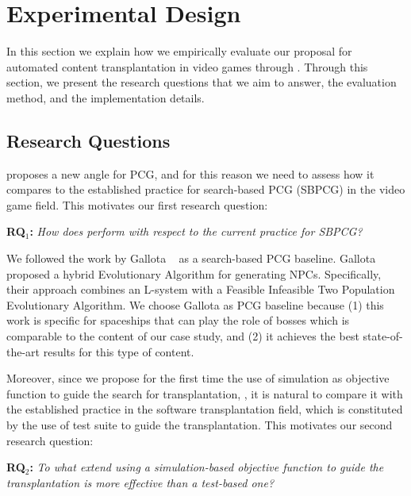 \section{Experimental Design} 
\label{sec:Evaluation}

In this section we explain how we empirically evaluate our proposal for automated content transplantation in video games through \ApproachName{}. 
Through this section, we present the research questions that we aim to answer, the evaluation method, and the implementation details.

\subsection{Research Questions}

\ApproachName{} proposes a new angle for PCG, and for this reason we need to assess how it compares to the established practice for search-based PCG (SBPCG)  in the video game field. This motivates our first research question:

\textbf{RQ$_1$: }\textit{How does \simhotep{} perform with respect to the current practice for SBPCG?}

We followed the work by Gallota \etal~\cite{gallotta2022evolving} as a search-based  PCG baseline. Gallota \etal proposed a hybrid Evolutionary Algorithm for generating NPCs. Specifically, their approach combines an L-system with a Feasible Infeasible Two Population Evolutionary Algorithm. We choose Gallota \etal as PCG baseline because (1) this work is specific for spaceships that can play the role of bosses which is comparable to the content of our case study, and (2) it achieves the best state-of-the-art results for this type of content. 

Moreover,  since we propose for the first time the use of simulation as objective function to guide the search for transplantation, \simhotep, it is natural to compare it with the established practice in the software transplantation field, which is constituted by the use of test suite to guide the transplantation. This motivates our second research question:

\textbf{RQ$_2$: }\textit{To what extend using a simulation-based objective function to guide the transplantation is more effective than a test-based one?}

